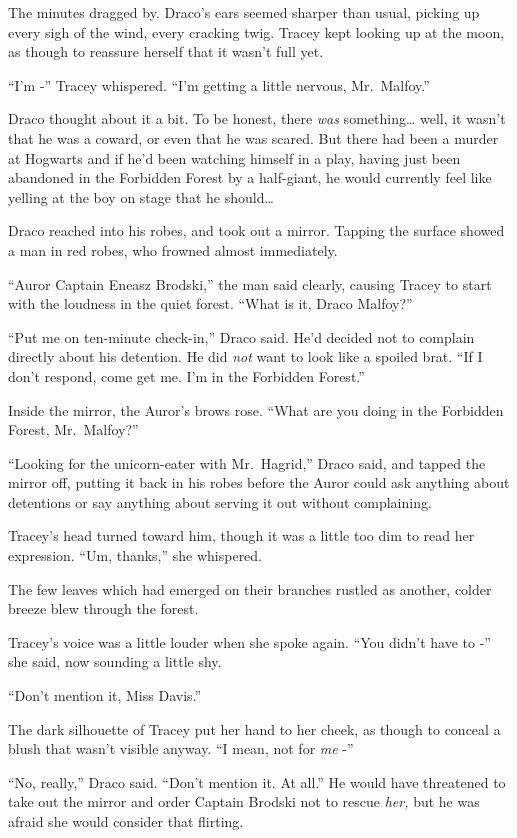 The minutes dragged by. Draco's ears seemed sharper than usual, picking
up every sigh of the wind, every cracking twig. Tracey kept looking up
at the moon, as though to reassure herself that it wasn't full yet.

``I'm -'' Tracey whispered. ``I'm getting a little nervous,
Mr.~Malfoy.''

Draco thought about it a bit. To be honest, there \emph{was}
something\ldots{} well, it wasn't that he was a coward, or even that he
was scared. But there had been a murder at Hogwarts and if he'd been
watching himself in a play, having just been abandoned in the Forbidden
Forest by a half-giant, he would currently feel like yelling at the boy
on stage that he should\ldots{}

Draco reached into his robes, and took out a mirror. Tapping the surface
showed a man in red robes, who frowned almost immediately.

``Auror Captain Eneasz Brodski,'' the man said clearly, causing Tracey
to start with the loudness in the quiet forest. ``What is it, Draco
Malfoy?''

``Put me on ten-minute check-in,'' Draco said. He'd decided not to
complain directly about his detention. He did \emph{not} want to look
like a spoiled brat. ``If I don't respond, come get me. I'm in the
Forbidden Forest.''

Inside the mirror, the Auror's brows rose. ``What are you doing in the
Forbidden Forest, Mr.~Malfoy?''

``Looking for the unicorn-eater with Mr.~Hagrid,'' Draco said, and
tapped the mirror off, putting it back in his robes before the Auror
could ask anything about detentions or say anything about serving it out
without complaining.

Tracey's head turned toward him, though it was a little too dim to read
her expression. ``Um, thanks,'' she whispered.

The few leaves which had emerged on their branches rustled as another,
colder breeze blew through the forest.

Tracey's voice was a little louder when she spoke again. ``You didn't
have to -'' she said, now sounding a little shy.

``Don't mention it, Miss Davis.''

The dark silhouette of Tracey put her hand to her cheek, as though to
conceal a blush that wasn't visible anyway. ``I mean, not for \emph{me}
-''

``No, really,'' Draco said. ``Don't mention it. At all.'' He would have
threatened to take out the mirror and order Captain Brodski not to
rescue \emph{her,} but he was afraid she would consider that flirting.

